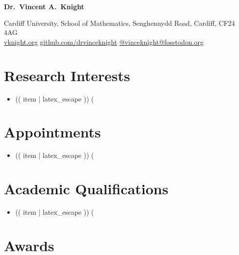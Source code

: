 \documentclass[10pt]{article}
\begin{document}
{\LARGE \textbf{Dr.\ Vincent A.\ Knight}}

\medskip
Cardiff University, School of Mathematics, Senghennydd Road, Cardiff, CF24 4AG\\
\href{https://vknight.org}{vknight.org} \quad
\href{https://github.com/drvinceknight}{github.com/drvinceknight} \quad
\href{https://fosstodon.org/@vinceknight}{@vinceknight@fosstodon.org}

\bigskip

\section{Research Interests}

\begin{itemize}
(%
  \item (( item | latex_escape ))
(%
\end{itemize}

\section{Appointments}

\begin{itemize}
(%
  \item (( item | latex_escape ))
(%
\end{itemize}

\section{Academic Qualifications}

\begin{itemize}
(%
  \item (( item | latex_escape ))
(%
\end{itemize}

\section{Awards}
\end{document}
